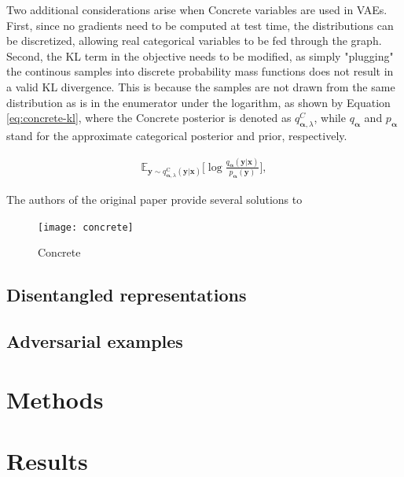\documentclass{report}
\begin{document}
\noindent Two additional considerations arise when Concrete variables are used in VAEs. First, since no gradients need to be computed at test time, the distributions can be discretized, allowing real categorical variables to be fed through the graph. Second, the KL term in the objective needs to be modified, as simply "plugging" the continous samples into discrete probability mass functions does not result in a valid KL divergence. This is because the samples are not drawn from the same distribution as is in the enumerator under the logarithm, as shown by Equation \ref{eq:concrete-kl}, where the Concrete posterior is denoted as $q_{\boldsymbol{\alpha}, \lambda}^C$, while $q_{\boldsymbol{\alpha}}$ and $p_{\boldsymbol{\alpha}}$ stand for the approximate categorical posterior and prior, respectively.

\begin{equation}
\begin{gathered}
\mathbb{E}_{\boldsymbol{y} \sim q^{\text{C}}_{\boldsymbol{\alpha}, \lambda}(\boldsymbol{y} | \boldsymbol{x})} \Big[ \log \frac{q_{\boldsymbol{\alpha}}(\boldsymbol{y} | \boldsymbol{x})}{p_{\boldsymbol{\alpha}} (\boldsymbol{y})} \Big],
\end{gathered}
\label{eq:concrete-kl}
\end{equation}

\bigskip

\noindent The authors of the original paper \cite{concrete} provide several solutions to

\begin{figure}
\begin{center}
\texttt{[image: concrete]}
\caption{Concrete}
\label{fig:concrete}
\end{center}
\end{figure}

\section{Disentangled representations}

\section{Adversarial examples}
\chapter{Methods}

\chapter{Results}
\end{document}
